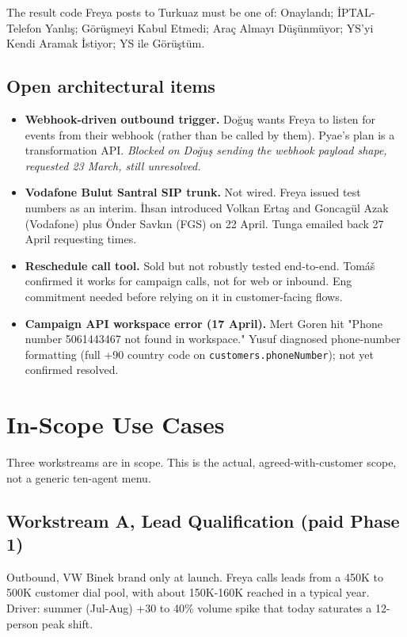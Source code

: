 \documentclass[10pt,a4paper]{article}
\begin{document}
The result code Freya posts to Turkuaz must be one of:
Onaylandı; İPTAL-Telefon Yanlış; Görüşmeyi Kabul Etmedi; Araç Almayı Düşünmüyor; YS'yi Kendi Aramak İstiyor; YS ile Görüştüm.

\subsection{Open architectural items}

\begin{itemize}[leftmargin=1em,itemsep=0.2em]
\item \textbf{Webhook-driven outbound trigger.} Doğuş wants Freya to listen for events from their webhook (rather than be called by them). Pyae's plan is a transformation API. \emph{Blocked on Doğuş sending the webhook payload shape, requested 23 March, still unresolved.}
\item \textbf{Vodafone Bulut Santral SIP trunk.} Not wired. Freya issued test numbers as an interim. İhsan introduced Volkan Ertaş and Goncagül Azak (Vodafone) plus Önder Savkın (FGS) on 22 April. Tunga emailed back 27 April requesting times.
\item \textbf{Reschedule call tool.} Sold but not robustly tested end-to-end. Tomáš confirmed it works for campaign calls, not for web or inbound. Eng commitment needed before relying on it in customer-facing flows.
\item \textbf{Campaign API workspace error (17 April).} Mert Goren hit "Phone number 5061443467 not found in workspace." Yusuf diagnosed phone-number formatting (full +90 country code on \texttt{customers.phoneNumber}); not yet confirmed resolved.
\end{itemize}

\newpage

\section{In-Scope Use Cases}

Three workstreams are in scope. This is the actual, agreed-with-customer scope, not a generic ten-agent menu.

\subsection{Workstream A, Lead Qualification (paid Phase 1)}

Outbound, VW Binek brand only at launch. Freya calls leads from a 450K to 500K customer dial pool, with about 150K-160K reached in a typical year. Driver: summer (Jul-Aug) +30 to 40\% volume spike that today saturates a 12-person peak shift.
\end{document}
